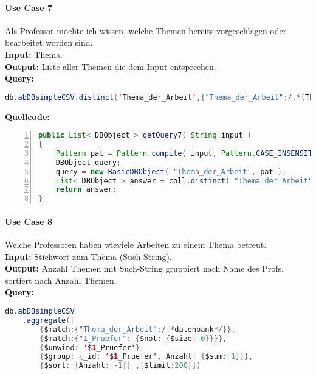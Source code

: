 \paragraph{Use Case 7} Als Professor möchte ich wissen, welche Themen bereits vorgeschlagen oder bearbeitet worden sind. \\
\textbf{Input:} Thema. \\
\textbf{Output:} Liste aller Themen die dem Input entsprechen. \\
\textbf{Query:}

\begin{lstlisting}[caption={Query zu Use Case 7},language=java,captionpos=t,numbers=none, numberstyle=\tiny,basicstyle=\scriptsize,breaklines=true]
db.abDBsimpleCSV.distinct('Thema_der_Arbeit',{"Thema_der_Arbeit":/.*(Thema).*/})
\end{lstlisting}\label{lst:query7}

\textbf{Quellcode:}

\begin{lstlisting}[caption={Quellcode zu Use Case 7},language=java,captionpos=t,numbers=left, numberstyle=\tiny,basicstyle=\scriptsize,breaklines=true]
public List< DBObject > getQuery7( String input )
{
    Pattern pat = Pattern.compile( input, Pattern.CASE_INSENSITIVE );
    DBObject query;
    query = new BasicDBObject( "Thema_der_Arbeit", pat );
    List< DBObject > answer = coll.distinct( "Thema_der_Arbeit", query );
    return answer;
}
\end{lstlisting}\label{lst:query7code}

\paragraph{Use Case 8} Welche Professoren haben wieviele Arbeiten zu einem Thema betreut. \\
\textbf{Input:} Stichwort zum Thema (Such-String). \\
\textbf{Output:} Anzahl Themen mit Such-String gruppiert nach Name des Profs, sortiert nach Anzahl Themen. \\
\textbf{Query:}

\begin{lstlisting}[caption={Query zu Use Case 8},language=java,captionpos=t,numbers=none, numberstyle=\tiny,basicstyle=\scriptsize,breaklines=true]
db.abDBsimpleCSV
	.aggregate([
		{$match:{"Thema_der_Arbeit":/.*datenbank*/}},
		{$match:{"1_Pruefer": {$not: {$size: 0}}}},
		{$unwind: '$1_Pruefer'},
		{$group: {_id: '$1_Pruefer', Anzahl: {$sum: 1}}},
		{$sort: {Anzahl: -1}} ,{$limit:200}])
\end{lstlisting}\label{lst:query8}

